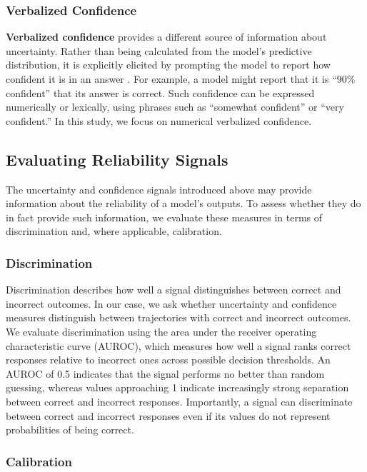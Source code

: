 \documentclass{article}
\begin{document}
\subsubsection{Verbalized Confidence}

\textbf{Verbalized confidence} provides a different source of information about uncertainty. Rather than being calculated from the model's predictive distribution, it is explicitly elicited by prompting the model to report how confident it is in an answer \cite{tian2023calibration,kadavath2022know}. For example, a model might report that it is ``90\% confident'' that its answer is correct. Such confidence can be expressed numerically or lexically, using phrases such as ``somewhat confident'' or ``very confident.'' In this study, we focus on numerical verbalized confidence.


\subsection{Evaluating Reliability Signals}
\label{sec:background-evaluation}

The uncertainty and confidence signals introduced above may provide information about the reliability of a model's outputs. To assess whether they do in fact provide such information, we evaluate these measures in terms of discrimination and, where applicable, calibration.

\subsubsection{Discrimination}

Discrimination describes how well a signal distinguishes between correct and incorrect outcomes. In our case, we ask whether uncertainty and confidence measures distinguish between trajectories with correct and incorrect outcomes. We evaluate discrimination using the area under the receiver operating characteristic curve (AUROC), which measures how well a signal ranks correct responses relative to incorrect ones across possible decision thresholds. An AUROC of 0.5 indicates that the signal performs no better than random guessing, whereas values approaching 1 indicate increasingly strong separation between correct and incorrect responses. Importantly, a signal can discriminate between correct and incorrect responses even if its values do not represent probabilities of being correct.

\subsubsection{Calibration}
\end{document}
